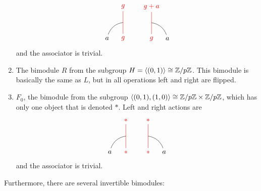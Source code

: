 \begin{enumerate}
\begin{equation}
				\begin{tikzpicture}[scale=0.8,baseline=(current bounding box.center)]
				\node[red](m) at (0,0) {$g$};
				\node(b) at (-1,0) {$a$};
				\node[red](abm) at (0,2) {$g$};
				\draw[red] (m)-- (abm);
				\draw (b) to [bend left] (0,1);
				\end{tikzpicture}\hspace{20pt}
				\begin{tikzpicture}[scale=0.8,baseline=(current bounding box.center)]
				\node[red](m) at (0,0) {$g$};
				\node(b) at (1,0) {$a$};
				\node[red](abm) at (0,2) {$g+a$};
				\draw[red] (m)-- (abm);
				\draw (b) to [bend right] (0,1);
				\end{tikzpicture}
			\end{equation}
		and the associator is trivial.
		\item The bimodule $R$ from the subgroup $H=\langle(0,1)\rangle\cong \mathbb{Z}/p\mathbb{Z}$. This bimodule is basically the same as $L$, but in all operations left and right are flipped.
		\item $F_0$, the bimodule from the subgroup $\langle(0,1),(1,0)\rangle\cong\mathbb{Z}/p\mathbb{Z}\times\mathbb{Z}/p\mathbb{Z}$, which has only one object that is denoted $*$. Left and right actions are
			\begin{equation}
				\begin{tikzpicture}[scale=0.8,baseline=(current bounding box.center)]
				\node[red](m) at (0,0) {$*$};
				\node(b) at (-1,0) {$a$};
				\node[red](abm) at (0,2) {$*$};
				\draw[red] (m)-- (abm);
				\draw (b) to [bend left] (0,1);
				\end{tikzpicture}\hspace{20pt}
				\begin{tikzpicture}[scale=0.8,baseline=(current bounding box.center)]
				\node[red](m) at (0,0) {$*$};
				\node(b) at (1,0) {$a$};
				\node[red](abm) at (0,2) {$*$};
				\draw[red] (m)-- (abm);
				\draw (b) to [bend right] (0,1);
				\end{tikzpicture}
			\end{equation}
		\noindent
		and the associator is trivial.
	\end{enumerate}
Furthermore, there are several invertible bimodules:
